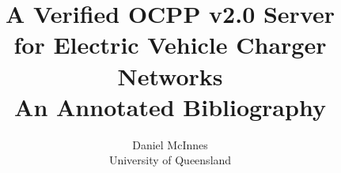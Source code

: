 \documentclass [11pt]{article}
\title{A Verified OCPP v2.0 Server \\for Electric Vehicle Charger Networks \\\medskip An Annotated Bibliography}
\author{Daniel McInnes \\University of Queensland}
\begin{document}
\maketitle
\nocite{*}


\end{document}
